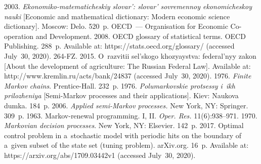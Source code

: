 





 \begin{multicols}{2}

\renewcommand{\bibname}{\protect\rmfamily References}

{\small\frenchspacing
 {%
 \begin{thebibliography}{99}
 2003.  \textit{Ekonomiko-matematicheskiy slovar': slovar' 
 sovremennoy ekonomicheskoy nauki} [Economic and mathematical dictionary: 
 Modern economic science dictionary]. Moscow: Delo. 520~p.
OECD~--- Organisation for Economic Co-operation and Development. 2008.
OECD glossary of statistical terms. OECD Publishing. 288~p. Available at: 
{\sf https://stats.oecd.org/glossary/} (accessed July~30, 2020).
264-FZ. 2015. O~razvitii sel'skogo khozyaystva: 
fe\-de\-ral'\-nyy zakon [About the development of agriculture: The 
Russian Federal Law]. Available at:
{\sf http://www.kremlin.\linebreak ru/acts/bank/24837} (accessed July~30, 2020).
 1976.  \textit{Finite Markov chains}. Prentice-Hall. 232~p.
 1976.  \textit{Polumarkovskie protsessy i~ikh prilozheniya} [Semi-Markov 
 processes and their applications]. Kiev: Naukova dumka. 184~p.
 2006. 
 \textit{Applied semi-Markov processes.} New York, NY: Springer. 309~p.
 1963. Markov-renewal programming. 
I, II.  \textit{Oper. Res.} 11(6):938--971.
 1970.  \textit{Markovian decision processes}. New York, NY: Elsevier. 142~p.
 2017. 
Optimal control problem in a~stochastic model with periodic hits 
on the boundary of a~given subset of the state set (tuning problem). 
 {arXiv.org}. 16~p. Available at: 
 {\sf https://arxiv.org/abs/1709.03442v1} (accessed July~30, 2020).

\end{thebibliography}}}
\end{multicols}
